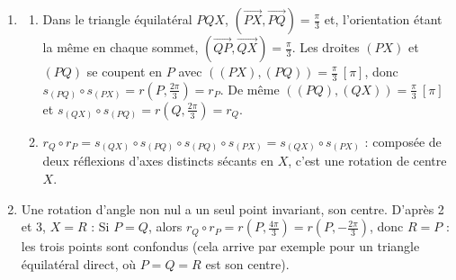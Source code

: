 \begin{corrige}
\begin{sol}
\begin{enumerate}
            En composant à droite par $r_R^{-1}$ : $r_Q \circ r_P = r_R^{-1} = r\left(R,-\frac{2\pi}{3}\right)$.
      \item \begin{enumerate}
                  \item Dans le triangle équilatéral $PQX$, $(\overrightarrow{PX},\overrightarrow{PQ}) = \frac{\pi}{3}$ et, l'orientation étant la même en chaque sommet,
                        $(\overrightarrow{QP},\overrightarrow{QX}) = \frac{\pi}{3}$.
                        Les droites $(PX)$ et $(PQ)$ se coupent en $P$ avec $((PX),(PQ)) = \frac{\pi}{3}\ [\pi]$, donc
                        $s_{(PQ)} \circ s_{(PX)} = r(P, \frac{2\pi}{3}) = r_P$.
                        De même $((PQ),(QX)) = \frac{\pi}{3}\ [\pi]$ et $s_{(QX)} \circ s_{(PQ)} = r(Q,\frac{2\pi}{3}) = r_Q$.
                  \item $r_Q \circ r_P = s_{(QX)} \circ s_{(PQ)} \circ s_{(PQ)} \circ s_{(PX)} = s_{(QX)} \circ s_{(PX)}$ : composée de deux réflexions
                        d'axes distincts sécants en $X$, c'est une rotation de centre $X$.
            \end{enumerate}
      \item Une rotation d'angle non nul a un seul point invariant, son centre. D'après 2 et 3, $X = R$ :
            Si $P = Q$, alors $r_Q \circ r_P = r\left(P, \frac{4\pi}{3}\right) = r\left(P,-\frac{2\pi}{3}\right)$, donc $R = P$ : les trois points sont confondus
            (cela arrive par exemple pour un triangle équilatéral direct, où $P = Q = R$ est son centre).
\end{enumerate}
\end{sol}
\end{corrige}
